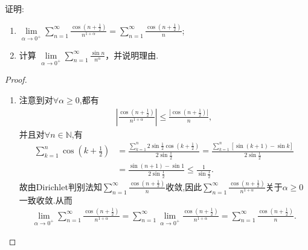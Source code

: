 \documentclass[../../main.tex]{subfiles}
\begin{document}
\begin{example}
证明: 
\begin{enumerate}[(1)]
\item $\lim\limits_{\alpha \to 0^+} \sum\limits_{n=1}^{\infty} \frac{\cos\left(n + \frac{1}{2}\right)}{n^{1+\alpha}} = \sum\limits_{n=1}^{\infty} \frac{\cos\left(n + \frac{1}{2}\right)}{n}$;

\item 计算 $\lim\limits_{\alpha \to 0^+} \sum\limits_{n=1}^{\infty} \frac{\sin n}{n^{\alpha}}$，并说明理由.
\end{enumerate}
\end{example}
\begin{proof}
\begin{enumerate}[(1)]
\item 注意到对$\forall \alpha \geqslant 0$,都有
\begin{align*}
\left| \frac{\cos \left( n+\frac{1}{2} \right)}{n^{1+\alpha}} \right| \leqslant \frac{|\cos \left( n+\frac{1}{2} \right)|}{n},
\end{align*}
并且对$\forall n\in \mathbb{N}$,有
\begin{align*}
\sum_{k=1}^n \cos \left( k+\frac{1}{2} \right)&=\frac{\sum\limits_{k=1}^n 2\sin \frac{1}{2}\cos \left( k+\frac{1}{2} \right)}{2\sin \frac{1}{2}}=\frac{\sum\limits_{k=1}^n \left[ \sin \left( k+1 \right) -\sin k \right]}{2\sin \frac{1}{2}}\\
&=\frac{\sin \left( n+1 \right) -\sin 1}{2\sin \frac{1}{2}} \leqslant \frac{1}{\sin \frac{1}{2}}.
\end{align*}
故由Dirichlet判别法知$\sum_{n=1}^{\infty} \frac{\cos \left( n+\frac{1}{2} \right)}{n}$收敛,因此$\sum_{n=1}^{\infty} \frac{\cos \left( n+\frac{1}{2} \right)}{n^{1+\alpha}}$关于$\alpha \geqslant 0$一致收敛.从而
\begin{align*}
\lim_{\alpha \rightarrow 0^+} \sum_{n=1}^{\infty} \frac{\cos \left( n+\frac{1}{2} \right)}{n^{1+\alpha}}=\sum_{n=1}^{\infty} \lim_{\alpha \rightarrow 0^+} \frac{\cos \left( n+\frac{1}{2} \right)}{n^{1+\alpha}}=\sum_{n=1}^{\infty} \frac{\cos \left( n+\frac{1}{2} \right)}{n}.
\end{align*}


\end{enumerate}
\end{proof}
\end{document}
